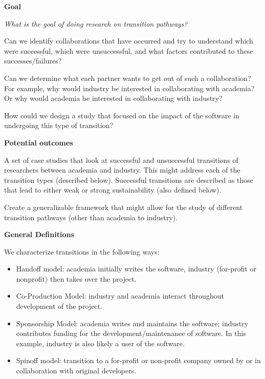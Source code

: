 \textbf{Goal}

\emph{What is the goal of doing research on transition pathways?} 

Can we identify collaborations that have occurred and try to understand which were successful, which were unsuccessful, and what factors contributed to these successes/failures? 

Can we determine what each partner wants to get out of such a collaboration?
For example, why would industry be interested in collaborating with academia? 
Or why would academia be interested in collaborating with industry?

How could we design a study that focused on the impact of the software in
undergoing this type of transition?

\textbf{Potential outcomes}

A set of case studies that look at successful and unsuccessful
transitions of researchers between academia and industry. This might address 
each of the transition types (described below). Successful transitions are
described as those that lead to either weak or strong sustainability (also
defined below).

Create a generalizable framework that might allow for the study of different
transition pathways (other than academia to industry).

\textbf{General Definitions}

We characterize transitions in the following ways:
\begin{itemize}

\item Handoff model: academia initially writes the software, industry (for-profit 
or nonprofit) then takes over the project.

\item Co-Production Model: industry and academia interact throughout development
of the project.

\item Sponsorship Model: academia writes and maintains the software; 
industry contributes funding for the development\slash maintenance of software.
In this example, industry is also likely a user of the software.

\item Spinoff model: transition to a for-profit or non-profit company owned by or in
collaboration with original developers.

\end{itemize}

